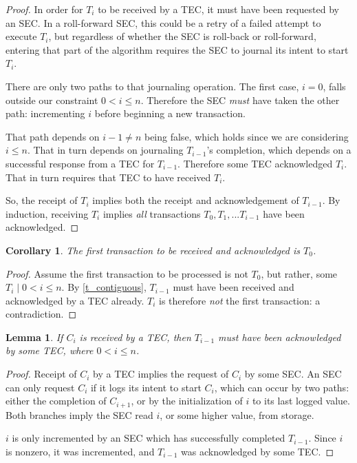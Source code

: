 \documentclass{article}
\newtheorem{lemma}[theorem]{Lemma}
\newtheorem{corollary}{Corollary}[theorem]
\begin{document}
\begin{proof}

In order for $T_i$ to be received by a TEC, it must have been requested by an
SEC. In a roll-forward SEC, this could be a retry of a failed attempt to
execute $T_i$, but regardless of whether the SEC is roll-back or roll-forward,
entering that part of the algorithm requires the SEC to journal its intent to
start $T_i$.

There are only two paths to that journaling operation. The first case, $i = 0$,
falls outside our constraint $0 < i \le n$. Therefore the SEC \textit{must}
have taken the other path: incrementing $i$ before beginning a new transaction.

That path depends on $i - 1 \ne n$ being false, which holds since we are
considering $i \le n$. That in turn depends on journaling $T_{i-1}$'s
completion, which depends on a successful response from a TEC for $T_{i-1}$.
Therefore some TEC acknowledged $T_i$. That in turn requires that TEC to have
received $T_i$.

So, the receipt of $T_i$ implies both the receipt and acknowledgement of
$T_{i-1}$. By induction, receiving $T_i$ implies \textit{all} transactions
$T_0, T_1, ... T_{i-1}$ have been acknowledged.

\end{proof}


\begin{corollary}
\label{t_zero_first}
The first transaction to be received and acknowledged is $T_0$.
\end{corollary}

\begin{proof}

Assume the first transaction to be processed is not $T_0$, but rather, some
$T_i \mid 0 < i \le n$. By \ref{t_contiguous}, $T_{i-1}$ must have been
received and acknowledged by a TEC already. $T_i$ is therefore \textit{not} the
first transaction: a contradiction.

\end{proof}


\begin{lemma}
\label{c_upper}
If $C_i$ is received by a TEC, then $T_{i - 1}$ must have been acknowledged by
some TEC, where $0 < i \le n$.
\end{lemma}

\begin{proof}

Receipt of $C_i$ by a TEC implies the request of $C_i$ by some SEC. An SEC can
only request $C_i$ if it logs its intent to start $C_i$, which can occur by two
paths: either the completion of $C_{i+1}$, or by the initialization of $i$ to
its last logged value. Both branches imply the SEC read $i$, or some higher
value, from storage.

$i$ is only incremented by an SEC which has successfully completed $T_{i-1}$.
Since $i$ is nonzero, it was incremented, and $T_{i-1}$ was acknowledged by
some TEC.

\end{proof}
\end{document}
